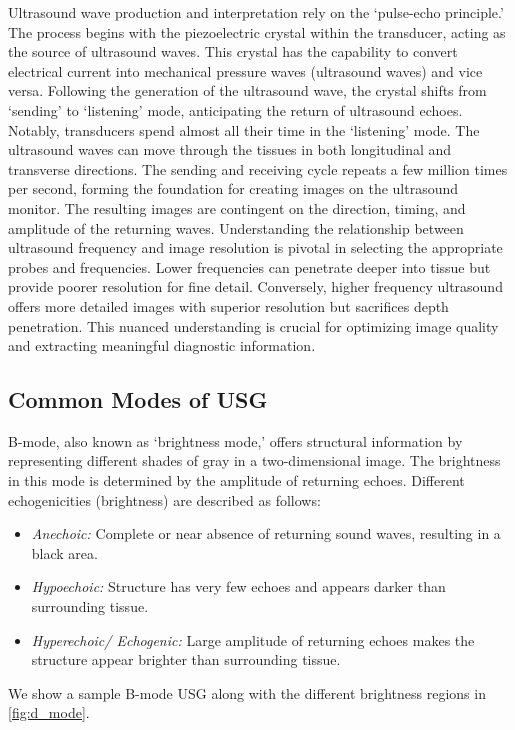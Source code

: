 Ultrasound wave production and interpretation rely on the `pulse-echo principle.' The process begins with the piezoelectric crystal within the transducer, acting as the source of ultrasound waves. This crystal has the capability to convert electrical current into mechanical pressure waves (ultrasound waves) and vice versa. Following the generation of the ultrasound wave, the crystal shifts from `sending' to `listening' mode, anticipating the return of ultrasound echoes. Notably, transducers spend almost all their time in the `listening' mode. The ultrasound waves can move through the tissues in both longitudinal and transverse directions. 
The sending and receiving cycle repeats a few million times per second, forming the foundation for creating images on the ultrasound monitor. The resulting images are contingent on the direction, timing, and amplitude of the returning waves.
Understanding the relationship between ultrasound frequency and image resolution is pivotal in selecting the appropriate probes and frequencies. Lower frequencies can penetrate deeper into tissue but provide poorer resolution for fine detail. Conversely, higher frequency ultrasound offers more detailed images with superior resolution but sacrifices depth penetration. This nuanced understanding is crucial for optimizing image quality and extracting meaningful diagnostic information.

\subsection{Common Modes of USG}
%
%

%
B-mode, also known as `brightness mode,' offers structural information by representing different shades of gray in a two-dimensional image. The brightness in this mode is determined by the amplitude of returning echoes. Different echogenicities (brightness) are described as follows:
\begin{itemize}
    \item \emph{Anechoic:} Complete or near absence of returning sound waves, resulting in a black area.
    \item \emph{Hypoechoic:} Structure has very few echoes and appears darker than surrounding tissue.
    \item \emph{Hyperechoic/ Echogenic:} Large amplitude of returning echoes makes the structure appear brighter than surrounding tissue.
\end{itemize}
We show a sample B-mode USG along with the different brightness regions in \cref{fig:d_mode}.

